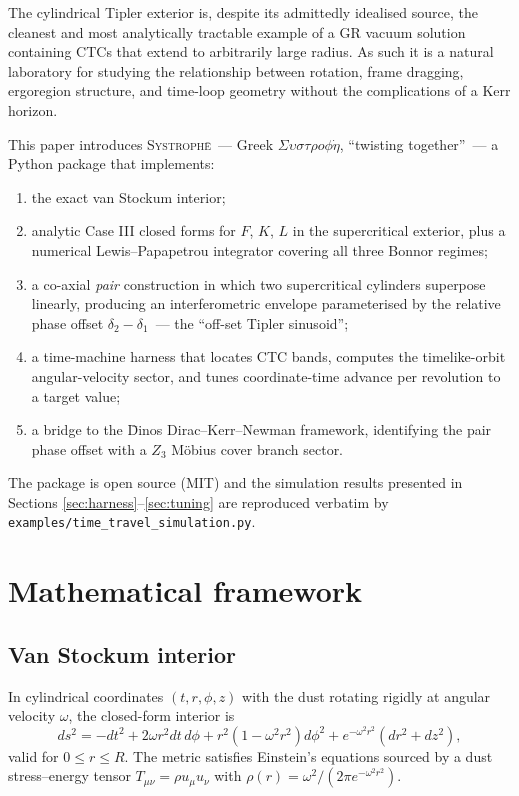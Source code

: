 \documentclass[11pt,a4paper]{article}
\begin{document}
The cylindrical Tipler exterior is, despite its admittedly idealised
source, the cleanest and most analytically tractable example of a
GR vacuum solution containing CTCs that extend to arbitrarily large
radius. As such it is a natural laboratory for studying the relationship
between rotation, frame dragging, ergoregion structure, and time-loop
geometry without the complications of a Kerr horizon.

This paper introduces \textsc{Systroph\=e}~--- Greek
\emph{$\Sigma\upsilon\sigma\tau\rho o \phi \dot{\eta}$}, ``twisting
together''~--- a Python package that implements:

\begin{enumerate}[leftmargin=*]
\item the exact van Stockum interior;
\item analytic Case III closed forms for $F$, $K$, $L$ in the supercritical
exterior, plus a numerical Lewis--Papapetrou integrator covering all
three Bonnor regimes;
\item a co-axial \emph{pair} construction in which two supercritical
cylinders superpose linearly, producing an interferometric envelope
parameterised by the relative phase offset $\delta_2 - \delta_1$~---
the ``off-set Tipler sinusoid'';
\item a time-machine harness that locates CTC bands, computes the
timelike-orbit angular-velocity sector, and tunes coordinate-time
advance per revolution to a target value;
\item a bridge to the \=Dinos Dirac--Kerr--Newman framework, identifying
the pair phase offset with a $Z_3$ M\"obius cover branch sector.
\end{enumerate}

The package is open source (MIT) and the simulation results presented
in Sections \ref{sec:harness}--\ref{sec:tuning} are reproduced verbatim
by \texttt{examples/time\_travel\_simulation.py}.

\section{Mathematical framework}
\label{sec:math}

\subsection{Van Stockum interior}

In cylindrical coordinates $(t, r, \phi, z)$ with the dust rotating
rigidly at angular velocity $\omega$, the closed-form interior is
\begin{equation}
\label{eq:vs-interior}
ds^2 = -dt^2 + 2 \omega r^2 dt \, d\phi
       + r^2 (1 - \omega^2 r^2) d\phi^2
       + e^{-\omega^2 r^2} (dr^2 + dz^2),
\end{equation}
valid for $0 \le r \le R$. The metric satisfies Einstein's equations
sourced by a dust stress--energy tensor $T_{\mu\nu} = \rho u_\mu u_\nu$
with $\rho(r) = \omega^2 / (2\pi e^{-\omega^2 r^2})$.
\end{document}
